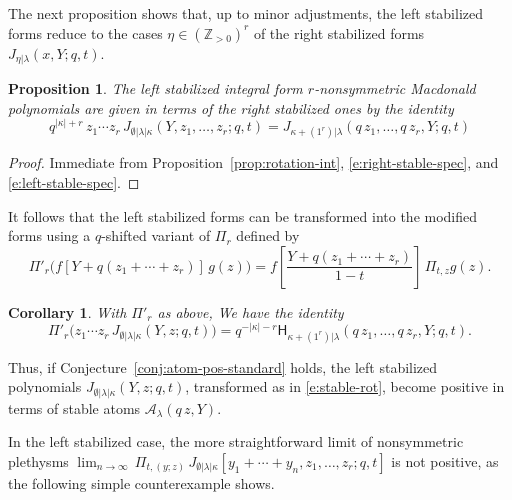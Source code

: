 \documentclass[12pt]{amsart}
\newtheorem{prop}[thm]{Proposition}
\newtheorem{cor}[thm]{Corollary}
\theoremstyle{definition}
\theoremstyle{remark}
\newcommand{\ZZ}{{\mathbb Z}}
\newcommand{\Acal}{{\mathcal A}}
\newcommand{\Pisf}{{\mathsf \Pi }}
\newcommand{\mE}{\mathsf H}   %
\newcommand{\Jns}{J}           %
\begin{document}
The next proposition shows that, up to minor adjustments, the left
stabilized forms reduce to the cases $\eta \in (\ZZ _{>0})^{r}$ of the
right stabilized forms $\Jns _{\eta |\lambda }(x,Y;q,t)$.

\begin{prop}\label{prop:stable-rotation}
The left stabilized integral form $r$-nonsymmetric Macdonald
polynomials are given in terms of the right stabilized ones by the
identity
\begin{equation}\label{e:stable-rotation}
q^{|\kappa |+r} \, z_{1}\cdots z_{r}\, \Jns _{\emptyset |\lambda
|\kappa }(Y, z_{1}, \ldots, z_{r};q,t) = \Jns _{\kappa +(1^{r})
|\lambda }(q\, z_{1},\ldots,q\, z_{r},Y;q,t)
\end{equation}
\end{prop}

\begin{proof}
Immediate from Proposition~\ref{prop:rotation-int},
\eqref{e:right-stable-spec}, and \eqref{e:left-stable-spec}.
\end{proof}

It follows that the left stabilized forms can be transformed into the
modified forms using a $q$-shifted variant of $\Pisf _{r}$ defined by
\begin{equation}\label{e:q-Pir}
\Pisf '_{r} \bigl(f[Y+q(z_{1}+\cdots +z_{r})]\,  g(z) \bigr) = 
f\left[\frac{Y+q(z_{1}+\cdots +z_{r})}{1-t}\right]\, \Pi _{t,z} g(z).
\end{equation}

\begin{cor}\label{cor:stable-rot}
With $\Pisf '_{r}$ as above, We have the identity
\begin{equation}\label{e:stable-rot}
\Pisf '_{r} \bigl( z_{1}\cdots z_{r}\, \Jns _{\emptyset |\lambda
|\kappa }(Y,z;q,t) \bigr) = q^{-|\kappa |-r} \mE _{\kappa
+(1^{r})|\lambda }(q \, z_{1},\ldots,q\, z_{r}, Y; q,t).
\end{equation}
\end{cor}

Thus, if Conjecture~\ref{conj:atom-pos-standard} holds, the left
stabilized polynomials $\Jns _{\emptyset |\lambda |\kappa }(Y,z ;q,t)$,
transformed as in \eqref{e:stable-rot}, become positive in terms of
stable atoms $\Acal _{\lambda }(q\, z,Y)$.

In the left stabilized case, the more straightforward limit of
nonsymmetric plethysms $\lim_{n\rightarrow \infty } \, \Pi _{t,(y;z)}\, 
\Jns _{\emptyset |\lambda |\kappa }[y_{1}+\cdots +y_{n},
z_{1},\ldots,z_{r}; q,t]$ is not positive, as the following simple
counterexample shows.
\end{document}

